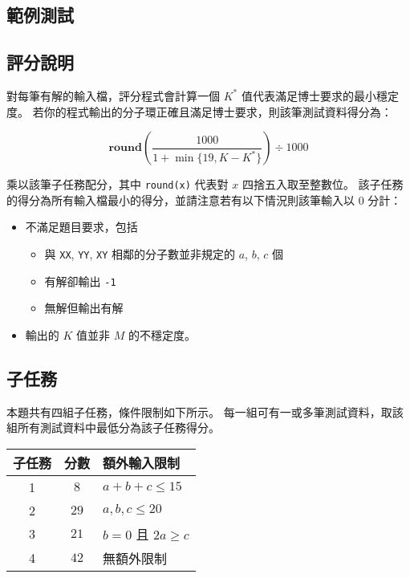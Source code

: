 \subsection{範例測試}

\begin{example}
%
%
%
%
%
\end{example}

\subsection{評分說明}

對每筆有解的輸入檔，評分程式會計算一個 \(K^{*}\)
值代表滿足博士要求的最小穩定度。
若你的程式輸出的分子環正確且滿足博士要求，則該筆測試資料得分為：

\[\textbf{round}(\frac{1000}{1 + \min\{19, K - K^{*}\}}) \div 1000\]

乘以該筆子任務配分，其中 \texttt{round(x)} 代表對 \(x\)
四捨五入取至整數位。
該子任務的得分為所有輸入檔最小的得分，並請注意若有以下情況則該筆輸入以
\(0\) 分計：

\begin{itemize}
\tightlist
\item
  不滿足題目要求，包括

  \begin{itemize}
  \tightlist
  \item
    與 \texttt{XX}, \texttt{YY}, \texttt{XY} 相鄰的分子數並非規定的
    \(a\), \(b\), \(c\) 個
  \item
    有解卻輸出 \texttt{-1}
  \item
    無解但輸出有解
  \end{itemize}
\item
  輸出的 \(K\) 值並非 \(M\) 的不穩定度。
\end{itemize}

\subsection{子任務}

本題共有四組子任務，條件限制如下所示。
每一組可有一或多筆測試資料，取該組所有測試資料中最低分為該子任務得分。

\begin{longtable}[]{@{}ccl@{}}
\toprule
子任務 & 分數 & 額外輸入限制 \\
\midrule
\endhead
1 & \(8\) & \(a + b + c \le 15\) \\
2 & \(29\) & \(a, b, c \le 20\) \\
3 & \(21\) & \(b=0\) 且 \(2a \ge c\) \\
4 & \(42\) & 無額外限制 \\
\bottomrule
\end{longtable}


